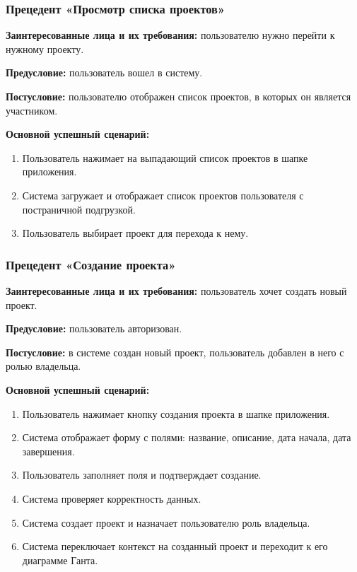\subsubsection{Прецедент «Просмотр списка проектов»}

\textbf{Заинтересованные лица и их требования:} пользователю нужно перейти к нужному проекту.

\textbf{Предусловие:} пользователь вошел в систему.

\textbf{Постусловие:} пользователю отображен список проектов, в которых он является участником.

\textbf{Основной успешный сценарий:}
\begin{enumerate}
    \item Пользователь нажимает на выпадающий список проектов в шапке приложения.
    \item Система загружает и отображает список проектов пользователя с постраничной подгрузкой.
    \item Пользователь выбирает проект для перехода к нему.
\end{enumerate}

\subsubsection{Прецедент «Создание проекта»}

\textbf{Заинтересованные лица и их требования:} пользователь хочет создать новый проект.

\textbf{Предусловие:} пользователь авторизован.

\textbf{Постусловие:} в системе создан новый проект, пользователь добавлен в него с ролью владельца.

\textbf{Основной успешный сценарий:}
\begin{enumerate}
    \item Пользователь нажимает кнопку создания проекта в шапке приложения.
    \item Система отображает форму с полями: название, описание, дата начала, дата завершения.
    \item Пользователь заполняет поля и подтверждает создание.
    \item Система проверяет корректность данных.
    \item Система создает проект и назначает пользователю роль владельца.
    \item Система переключает контекст на созданный проект и переходит к его диаграмме Ганта.
\end{enumerate}

